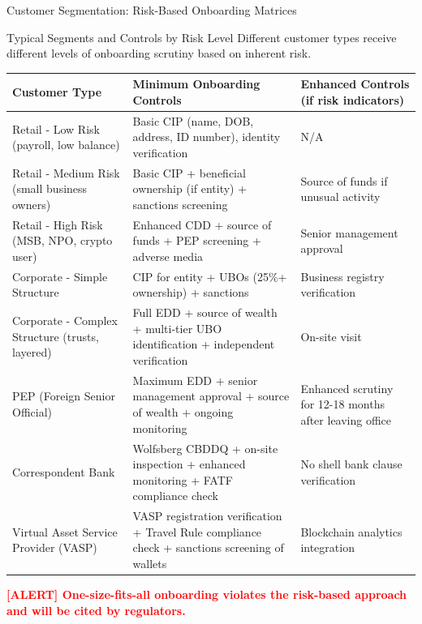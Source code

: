 \documentclass[11pt,a4paper]{beamer}
\newcommand{\redflag}[1]{\textcolor{red}{\textbf{[ALERT] #1}}}
\begin{document}
\begin{frame}{Customer Segmentation: Risk-Based Onboarding Matrices}
	\begin{block}{Typical Segments and Controls by Risk Level}
		Different customer types receive different levels of onboarding scrutiny based on inherent risk.
	\end{block}
	\begin{longtable}{p{}|p{}|p{}}
		\hline
		\rowcolor{lightgray}
		\textbf{Customer Type} & \textbf{Minimum Onboarding Controls} & \textbf{Enhanced Controls (if risk indicators)} \\
		\hline
		Retail - Low Risk (payroll, low balance) & Basic CIP (name, DOB, address, ID number), identity verification & N/A \\
		\hline
		Retail - Medium Risk (small business owners) & Basic CIP + beneficial ownership (if entity) + sanctions screening & Source of funds if unusual activity \\
		\hline
		Retail - High Risk (MSB, NPO, crypto user) & Enhanced CDD + source of funds + PEP screening + adverse media & Senior management approval \\
		\hline
		Corporate - Simple Structure & CIP for entity + UBOs (25\%+ ownership) + sanctions & Business registry verification \\
		\hline
		Corporate - Complex Structure (trusts, layered) & Full EDD + source of wealth + multi-tier UBO identification + independent verification & On-site visit \\
		\hline
		PEP (Foreign Senior Official) & Maximum EDD + senior management approval + source of wealth + ongoing monitoring & Enhanced scrutiny for 12-18 months after leaving office \\
		\hline
		Correspondent Bank & Wolfsberg CBDDQ + on-site inspection + enhanced monitoring + FATF compliance check & No shell bank clause verification \\
		\hline
		Virtual Asset Service Provider (VASP) & VASP registration verification + Travel Rule compliance check + sanctions screening of wallets & Blockchain analytics integration \\
		\hline
	\end{longtable}
	\redflag{One-size-fits-all onboarding violates the risk-based approach and will be cited by regulators.}
\end{frame}
\end{document}
